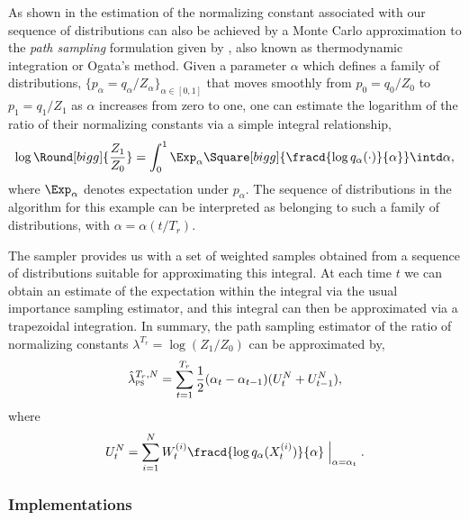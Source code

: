 \documentclass[11pt, bib, hyper, mint, minted=cache]{marticle}
\begin{document}
As shown in \textcite{Zhou2013mc} the estimation of the normalizing constant
associated with our sequence of distributions can also be achieved by a Monte
Carlo approximation to the \emph{path sampling} formulation given by
\textcite{Gelman:1998ei}, also known as thermodynamic integration or Ogata's
method. Given a parameter $\alpha$ which defines a family of distributions,
$\{p_{\alpha} = q_{\alpha} / Z_\alpha\}_{\alpha \in [0,1]}$ that moves
smoothly from $p_0 = q_0 / Z_0$ to $p_1 = q_1 / Z_1$ as $\alpha$ increases
from zero to one, one can estimate the logarithm of the ratio of their
normalizing constants via a simple integral relationship,
\begin{equation}
  \log\Round[bigg]{\frac{Z_1}{Z_0}} = \int_{0}^{1} \Exp_\alpha
  \Square[bigg]{\fracd{\log q_{\alpha}(\cdot)}{\alpha}} \intd\alpha,
  \label{eq:path_identity}
\end{equation}
where $\Exp_\alpha$ denotes expectation under $p_\alpha$. The sequence of
distributions in the \smc algorithm for this example can be interpreted as
belonging to such a family of distributions, with $\alpha = \alpha(t/T_r)$.

The \smc sampler provides us with a set of weighted samples obtained from a
sequence of distributions suitable for approximating this integral. At each
time $t$ we can obtain an estimate of the expectation within the integral via
the usual importance sampling estimator, and this integral can then be
approximated via a trapezoidal integration. In summary, the path sampling
estimator of the ratio of normalizing constants $\lambda^{T_r} =
\log(Z_1/Z_0)$ can be approximated by,
\begin{equation}
  \hat\lambda_{\text{\textsc{ps}}}^{T_r,N} = \sum_{t=1}^{T_r}
  \frac{1}{2}(\alpha_t - \alpha_{t - 1})(U_t^N + U_{t-1}^N),
  \label{eq:path_est}
\end{equation}
where
\begin{equation}
  U_t^N = \sum_{i=1}^N
  W_t^{(i)} \fracd{\log q_{\alpha}(X_t^{(i)})}{\alpha}
  \Bigm|_{\alpha = \alpha_t}.
  \label{eq:path_import}
\end{equation}

\subsubsection{Implementations}
\end{document}
